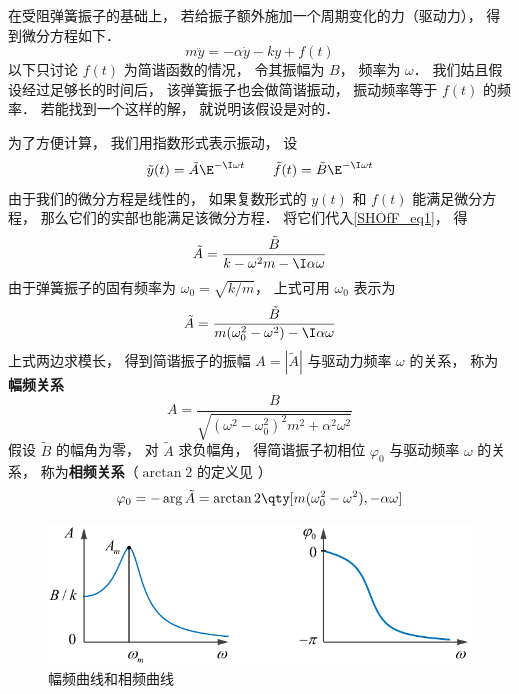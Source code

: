 

在受阻弹簧振子的基础上， 若给振子额外施加一个周期变化的力（驱动力）， 得到微分方程如下．
\begin{equation}\label{SHOfF_eq1}
m\ddot y = -\alpha \dot y - ky + f(t)
\end{equation}
以下只讨论 $f(t)$ 为简谐函数的情况， 令其振幅为 $B$， 频率为 $\omega$． 我们姑且假设经过足够长的时间后， 该弹簧振子也会做简谐振动， 振动频率等于 $f(t)$ 的频率． 若能找到一个这样的解， 就说明该假设是对的．

为了方便计算， 我们用指数形式表示振动， 设
\begin{equation}
\tilde y(t) = \tilde A\E^{-\I\omega t} \qquad
\tilde f(t) = \tilde B\E^{-\I \omega t}
\end{equation}
由于我们的微分方程是线性的， 如果复数形式的 $y(t)$ 和 $f(t)$ 能满足微分方程， 那么它们的实部也能满足该微分方程． 将它们代入\autoref{SHOfF_eq1}， 得
\begin{equation}
\tilde A =  \frac{\tilde B}{k -\omega^2 m - \I\alpha\omega}
\end{equation}
由于弹簧振子的固有频率为 $\omega_0 = \sqrt{k/m}$， 上式可用 $\omega_0$ 表示为
\begin{equation}
\tilde A = \frac{\tilde B}{m(\omega_0^2 - \omega^2) - \I\alpha\omega}
\end{equation}
上式两边求模长， 得到简谐振子的振幅 $A = |\tilde A|$ 与驱动力频率 $\omega$ 的关系， 称为\textbf{幅频关系}
\begin{equation}\label{SHOfF_eq5}
A = \frac{B}{\sqrt{(\omega^2 - \omega_0^2)^2 m^2 + \alpha^2\omega^2}}
\end{equation}
假设 $\tilde B$ 的幅角为零， 对 $\tilde A$ 求负幅角， 得简谐振子初相位 $\varphi_0$ 与驱动频率 $\omega$ 的关系， 称为\textbf{相频关系}（$\arctan2$ 的定义见%
）
\begin{equation}\label{SHOfF_eq6}
\varphi_0 = -\arg \tilde A = \arctan2 \qty[m(\omega_0^2 - \omega^2), -\alpha\omega]
\end{equation}

\begin{figure}[ht]
\centering
\includegraphics[width=12cm]{./figures/SHOfF1.pdf}
\caption{幅频曲线和相频曲线} \label{SHOfF_fig1}
\end{figure}

